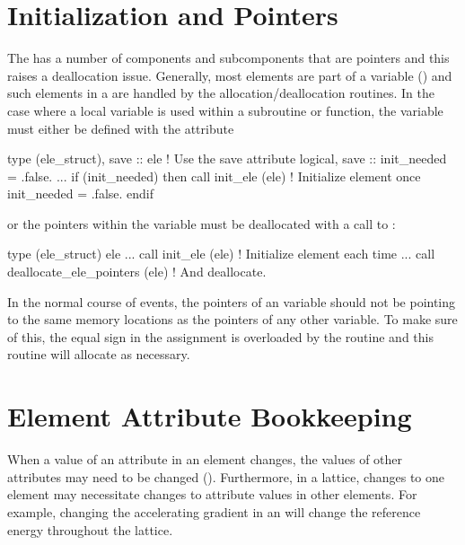 \section{Initialization and Pointers}

The  has a number of components and subcomponents 
that are pointers and this raises a deallocation issue.
Generally, most  elements are part of a 
variable ()
and such elements in a  are handled by the
 allocation/deallocation routines. 
In the case where a local 
variable is used within a subroutine or function, the  
variable must either be defined with the  attribute 
\begin{example}
  type (ele_struct), save :: ele          ! Use the save attribute
  logical, save :: init_needed = .false.
  ...
  if (init_needed) then
    call init_ele (ele)                ! Initialize element once
    init_needed = .false.
  endif
\end{example}
or the pointers within the variable must be deallocated  with a call to
:
\begin{example}
  type (ele_struct) ele  
  ...
  call init_ele (ele)                ! Initialize element each time
  ...
  call deallocate_ele_pointers (ele) ! And deallocate.
\end{example}

In the normal course of events, the pointers of an  variable
should not be pointing to the same memory locations as the pointers
of any other  variable. To make sure of this,
the equal sign in the assignment 
is overloaded by the routine 
and this routine will allocate as necessary.

\section{Element Attribute Bookkeeping}
\label{s:ele.book}

When a value of an attribute in an element changes, the values of
other attributes may need to be changed (). Furthermore,
in a lattice, changes to one element may necessitate changes to
attribute values in other elements. For example, changing the
accelerating gradient in an  will change the reference
energy throughout the lattice. 

